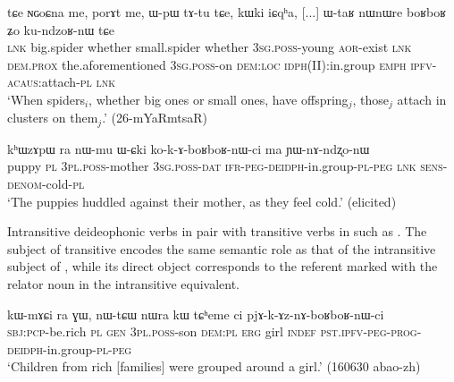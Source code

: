 \begin{exe}
\ex \label{ex:boRboR.kundzoRnW}
\gll tɕe ɴɢoɕna me, porɤt me, ɯ-pɯ tɤ-tu tɕe, kɯki iɕqʰa, [...] ɯ-taʁ nɯnɯre boʁboʁ ʑo ku-ndzoʁ-nɯ tɕe \\
\textsc{lnk} big.spider whether small.spider whether \textsc{3sg}.\textsc{poss}-young \textsc{aor}-exist \textsc{lnk} \textsc{dem}.\textsc{prox} the.aforementioned { } \textsc{3sg}.\textsc{poss}-on \textsc{dem}:\textsc{loc} \textsc{idph}(II):in.group \textsc{emph} \textsc{ipfv}-\textsc{acaus}:attach-\textsc{pl} \textsc{lnk} \\
\glt `When spiders$_i$, whether big ones or small ones, have offspring$_j$, those$_j$ attach in clusters on them$_j$.' (26-mYaRmtsaR)  
\end{exe}

\begin{exe}
\ex \label{ex:kokAboRboRnW}
\gll kʰɯzɤpɯ ra nɯ-mu ɯ-ɕki ko-k-ɤ-boʁboʁ-nɯ-ci ma ɲɯ-nɤ-ndʐo-nɯ \\
puppy \textsc{pl} \textsc{3pl}.\textsc{poss}-mother \textsc{3sg}.\textsc{poss}-\textsc{dat} \textsc{ifr}-\textsc{peg}-\textsc{deidph}-in.group-\textsc{pl}-\textsc{peg} \textsc{lnk} \textsc{sens}-\textsc{denom}-cold-\textsc{pl} \\
\glt `The puppies huddled against their mother, as they feel cold.' (elicited)
\end{exe}

Intransitive deideophonic verbs in   pair with transitive verbs in  such as . The subject of transitive  encodes the same semantic role as that of the intransitive subject of , while its direct object corresponds to the referent marked with the relator noun  in the intransitive equivalent.

\begin{exe}
\ex \label{ex:pjAkAznAboRboRnWci}
\gll kɯ-mɤɕi ra ɣɯ, nɯ-tɕɯ nɯra kɯ tɕʰeme ci pjɤ-k-ɤz-nɤ-boʁboʁ-nɯ-ci \\
\textsc{sbj}:\textsc{pcp}-be.rich \textsc{pl} \textsc{gen} \textsc{3pl}.\textsc{poss}-son \textsc{dem}:\textsc{pl} \textsc{erg} girl \textsc{indef} \textsc{pst}.\textsc{ipfv}-\textsc{peg}-\textsc{prog}-\textsc{deidph}-in.group-\textsc{pl}-\textsc{peg} \\
\glt `Children from rich [families] were grouped around a girl.' (160630 abao-zh)
\end{exe}

